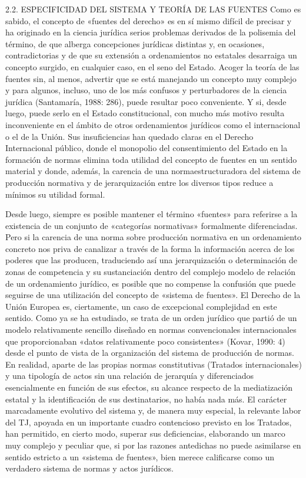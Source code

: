 \documentclass[10pt,a4paper]{article}
\begin{document}
2.2. ESPECIFICIDAD DEL SISTEMA Y TEORÍA DE LAS FUENTES 
Como es sabido, el concepto de «fuentes del derecho» es en sí mismo difícil de precisar y ha originado en la ciencia jurídica serios problemas derivados de la polisemia del término, de que alberga concepciones jurídicas distintas y, en ocasiones, contradictorias y de que su extensión a ordenamientos no estatales desarraiga un concepto surgido, en cualquier caso, en el seno del Estado. Acoger la teoría de las fuentes sin, al menos, advertir que se está manejando un concepto muy complejo y para algunos, incluso, uno de los más confusos y perturbadores de la ciencia jurídica (Santamaría, 1988: 286), puede resultar poco conveniente. Y si, desde luego, puede serlo en el Estado constitucional, con mucho más motivo resulta inconveniente en el ámbito de otros ordenamientos jurídicos como el internacional o el de la Unión. Sus insuficiencias han quedado claras en el Derecho Internacional público, donde el monopolio del consentimiento del Estado en la  formación de normas elimina toda utilidad del concepto de fuentes en un sentido material y donde, además, la carencia de una normaestructuradora del sistema de producción normativa y de jerarquización entre los diversos tipos reduce a mínimos su utilidad formal.

Desde luego, siempre es posible mantener el término «fuentes» para referirse a la existencia de un conjunto de «categorías normativas» formalmente diferenciadas. Pero si la carencia de una norma sobre producción normativa en un ordenamiento concreto nos priva de canalizar a través de la forma la información acerca de los poderes que las producen, traduciendo así una jerarquización o determinación de zonas de competencia y su sustanciación dentro del complejo modelo de relación de un ordenamiento jurídico, es posible que no compense la confusión que puede seguirse de una utilización del concepto de «sistema de fuentes». El Derecho de la Unión Europea es, ciertamente, un caso de excepcional complejidad en este sentido. Como ya se ha estudiado, se trata de un orden jurídico que partió de un modelo relativamente sencillo diseñado en normas convencionales internacionales que proporcionaban «datos relativamente poco consistentes» (Kovar, 1990: 4) desde el punto de vista de la organización del sistema de producción de normas. En realidad, aparte de las propias normas constitutivas (Tratados internacionales) y una tipología de actos sin una relación de jerarquía y diferenciados esencialmente en función de sus efectos, su alcance respecto de la mediatización estatal y la identificación de sus destinatarios, no había nada más. El carácter marcadamente evolutivo del sistema y, de manera muy especial, la relevante labor del TJ, apoyada en un importante cuadro contencioso previsto en los Tratados, han permitido, en cierto modo, superar sus deficiencias, elaborando un marco muy complejo y peculiar que, si por las razones antedichas no puede asimilarse en sentido estricto a un «sistema de fuentes», bien merece calificarse  como un verdadero sistema de normas y actos jurídicos.
\end{document}
